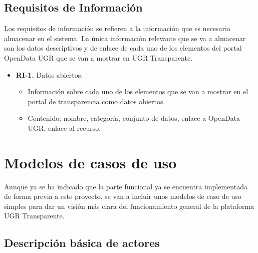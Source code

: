 \subsection{Requisitos de Información}

Los requisitos de información se refieren a la información que es necesaria almacenar en el sistema. La única información 
relevante que se va a almacenar son los datos descriptivos y de enlace de cada uno de los elementos del portal OpenData UGR 
que se van a mostrar en UGR Transparente.

\begin{itemize}
  \item \textbf{RI-1.} Datos abiertos.
  \begin{itemize}
    \item Información sobre cada uno de los elementos que se van a mostrar en el portal de transparencia como datos abiertos.
    \item Contenido: nombre, categoría, conjunto de datos, enlace a OpenData UGR, enlace al recurso.
  \end{itemize}
\end{itemize}

\section{Modelos de casos de uso}

Aunque ya se ha indicado que la parte funcional ya se encuentra implementada de forma previa a este proyecto, se van a incluir
unos modelos de caso de uso simples para dar un visión más clara del funcionamiento general de la plataforma UGR Transparente.

\subsection{Descripción básica de actores}

